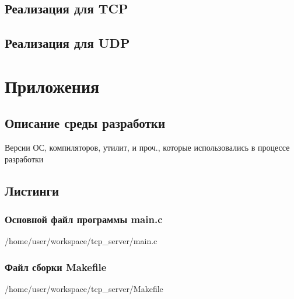 \documentclass[12pt,a4paper]{report}
\begin{document}
\section{Реализация для TCP}
\section{Реализация для UDP}

\chapter*{Приложения}
\section*{Описание среды разработки}
Версии ОС, компиляторов, утилит, и проч., которые использовались в процессе разработки
\section*{Листинги}
\subsection*{Основной файл программы main.c}

{/home/user/workspace/tcp_server/main.c}
\subsection*{Файл сборки Makefile}

{/home/user/workspace/tcp_server/Makefile}
\end{document}
